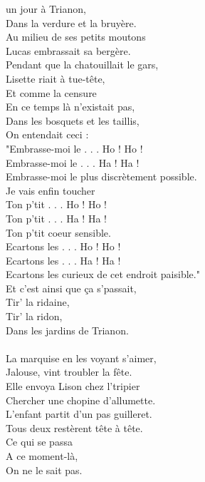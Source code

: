 
 un jour à Trianon,
\\Dans la verdure et la bruyère.
\\Au milieu de ses petits moutons
\\Lucas embrassait sa bergère.
\\Pendant que la chatouillait le gars,
\\Lisette riait à tue-tête,
\\Et comme la censure
\\En ce temps là n’existait pas,
\\Dans les bosquets et les taillis,
\\On entendait ceci :
\\"Embrasse-moi le . . . Ho ! Ho !
\\Embrasse-moi le . . . Ha ! Ha !
\\Embrasse-moi le plus discrètement possible.
\\Je vais enfin toucher
\\Ton p’tit . . . Ho ! Ho !
\\Ton p’tit . . . Ha ! Ha !
\\Ton p’tit coeur sensible.
\\Ecartons les . . . Ho ! Ho !
\\Ecartons les . . . Ha ! Ha !
\\Ecartons les curieux de cet endroit paisible."
\\Et c’est ainsi que ça s’passait,
\\Tir’ la ridaine,
\\Tir’ la ridon,
\\Dans les jardins de Trianon.
\\\\La marquise en les voyant s’aimer,
\\Jalouse, vint troubler la fête.
\\Elle envoya Lison chez l’tripier
\\Chercher une chopine d’allumette.
\\L’enfant partit d’un pas guilleret.
\\Tous deux restèrent tête à tête.
\\Ce qui se passa
\\A ce moment-là,
\\On ne le sait pas.
